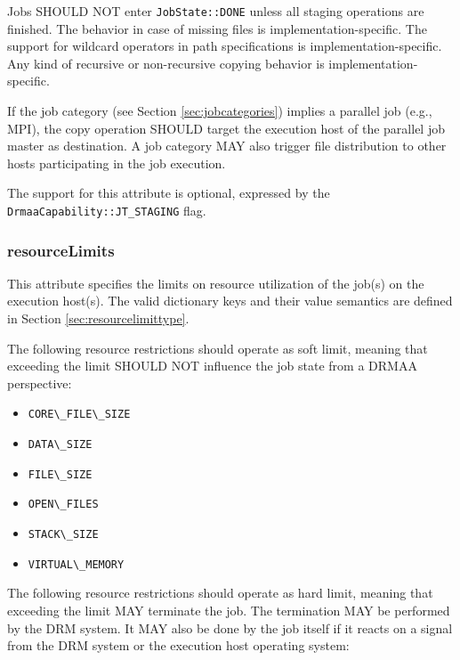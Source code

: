\documentclass{article}
\newcommand{\h}[1]{\lstinline|#1|}
\newcommand{\rat}[1]{}
\begin{document}
Jobs SHOULD NOT enter \h{JobState::DONE} unless all staging operations are finished. The behavior in case of missing files is implementation-specific. The support for wildcard operators in path specifications is implementation-specific. Any kind of recursive or non-recursive copying behavior is implementation-specific.

If the job category (see Section \ref{sec:jobcategories}) implies a parallel job (e.g., MPI), the copy operation SHOULD target the execution host of the parallel job master as destination. A job category MAY also trigger file distribution to other hosts participating in the job execution.

The support for this attribute is optional, expressed by the \h{DrmaaCapability::JT_STAGING} flag.

\rat{
Comparison to DRMAA 1.0: New job template attributes for file transfers were introduced. They allow to express a set of file staging activities, similar to the approach in LSF and SAGA. They replace the old transferFiles attribute, the according FileTransferMode data structure and the special host definition syntax in inputPath / outputPath / errorPath (different conf. calls, SAGA F2F meeting, solves issue \#5876)
}

\subsubsection{resourceLimits}

This attribute specifies the limits on resource utilization of the job(s) on the execution host(s). The valid dictionary keys and their value semantics are defined in Section \ref{sec:resourcelimittype}.

The following resource restrictions should operate as soft limit, meaning that exceeding the limit SHOULD NOT influence the job state from a DRMAA perspective:

\begin{itemize}
\item \h{CORE\_FILE\_SIZE}
\item \h{DATA\_SIZE}
\item \h{FILE\_SIZE}
\item \h{OPEN\_FILES}
\item \h{STACK\_SIZE}
\item \h{VIRTUAL\_MEMORY}
\end{itemize}

The following resource restrictions should operate as hard limit, meaning that exceeding the limit MAY terminate the job. The termination MAY be performed by the DRM system. It MAY also be done by the job itself if it reacts on a signal from the DRM system or the execution host operating system:
\end{document}
